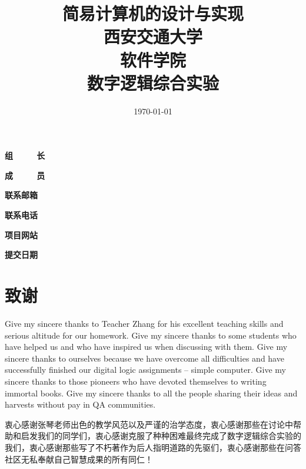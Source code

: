 \documentclass[UTF8]{ctexart}
\title{\Huge{简易计算机的设计与实现}\\ \huge{西安交通大学\\软件学院\\数字逻辑综合实验}}
\author{\huge{}}
\date{\Huge{\today}}
\begin{document}
  \maketitle
  \vspace{12mm}
  \begin{flushright}
  \Large{
    \textbf{组\ \ \ \ \ 长} 

    \textbf{成\ \ \ \ \ 员} 





    \textbf{联系邮箱} 

    \textbf{联系电话} 

    \textbf{项目网站} 

    \textbf{提交日期} \makebox[6em][l]{\ \today}
    }
    \end{flushright}
    \newpage
    \tableofcontents
    \newpage

    \section{致谢}
    Give my sincere thanks to Teacher Zhang for his excellent teaching skills and serious altitude for our homework. Give my sincere thanks to some students who have helped us and who have inspired us when discussing with them. Give my sincere thanks to ourselves because we have overcome all difficulties and have successfully finished our digital logic assignments -- simple computer. Give my sincere thanks to those pioneers who have devoted themselves to writing immortal books. Give my sincere thanks to all the people sharing their ideas and harvests without pay in QA communities.

    衷心感谢张琴老师出色的教学风范以及严谨的治学态度，衷心感谢那些在讨论中帮助和启发我们的同学们，衷心感谢克服了种种困难最终完成了数字逻辑综合实验的我们，衷心感谢那些写了不朽著作为后人指明道路的先驱们，衷心感谢那些在问答社区无私奉献自己智慧成果的所有同仁！
    \newpage
\end{document}
